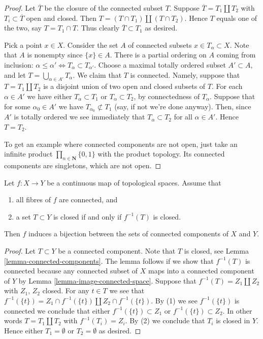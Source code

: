 \begin{proof}
Let $\overline{T}$ be the closure of the connected subset $T$.
Suppose $\overline{T} = T_1 \amalg T_2$ with $T_i \subset \overline{T}$
open and closed. Then $T = (T\cap T_1) \amalg (T \cap T_2)$. Hence
$T$ equals one of the two, say $T = T_1 \cap T$. Thus clearly
$\overline{T} \subset T_1$ as desired.

\medskip\noindent
Pick a point $x\in X$. Consider the set $A$ of connected subsets
$x \in T_\alpha \subset X$. Note that $A$ is nonempty since
$\{x\} \in A$. There is a partial ordering on $A$ coming from
inclusion: $\alpha \leq \alpha' \Leftrightarrow T_\alpha \subset T_{\alpha'}$.
Choose a maximal totally ordered subset $A' \subset A$, and let
$T = \bigcup_{\alpha \in A'} T_\alpha$. We claim that $T$ is
connected. Namely, suppose that $T =  T_1 \amalg T_2$ is a disjoint
union of two open and closed subsets of $T$.
For each $\alpha \in A'$ we have either $T_\alpha \subset T_1$
or $T_\alpha \subset T_2$, by connectedness of $T_\alpha$.
Suppose that for some $\alpha_0 \in A'$ we have
$T_{\alpha_0} \not\subset T_1$ (say, if not we're done anyway).
Then, since $A'$ is totally ordered we see immediately that
$T_\alpha \subset T_2$ for all $\alpha \in A'$. Hence $T = T_2$.

\medskip\noindent
To get an example where connected components are not open, just take
an infinite product $\prod_{n \in \mathbf{N}} \{0, 1\}$
with the product topology. Its connected components are singletons,
which are not open.
\end{proof}

\begin{lemma}
\label{lemma-connected-fibres-quotient-topology-connected-components}
Let $f : X \to Y$ be a continuous map of topological spaces.
Assume that
\begin{enumerate}
\item all fibres of $f$ are connected, and
\item a set $T \subset Y$ is closed if and only if $f^{-1}(T)$ is closed.
\end{enumerate}
Then $f$ induces a bijection between the sets of connected
components of $X$ and $Y$.
\end{lemma}

\begin{proof}
Let $T \subset Y$ be a connected component.
Note that $T$ is closed, see Lemma \ref{lemma-connected-components}.
The lemma follows if we show that $f^{-1}(T)$ is connected
because any connected subset of $X$ maps into a connected component
of $Y$ by Lemma \ref{lemma-image-connected-space}.
Suppose that $f^{-1}(T) = Z_1 \amalg Z_2$
with $Z_1$, $Z_2$ closed. For any $t \in T$ we see that
$f^{-1}(\{t\}) = Z_1 \cap f^{-1}(\{t\}) \amalg Z_2 \cap f^{-1}(\{t\})$.
By (1) we see $f^{-1}(\{t\})$ is connected we conclude that
either $f^{-1}(\{t\}) \subset Z_1$ or $f^{-1}(\{t\}) \subset Z_2$.
In other words $T = T_1 \amalg T_2$ with $f^{-1}(T_i) = Z_i$.
By (2) we conclude that $T_i$ is closed in $Y$.
Hence either $T_1 = \emptyset$ or $T_2 = \emptyset$ as desired.
\end{proof}

